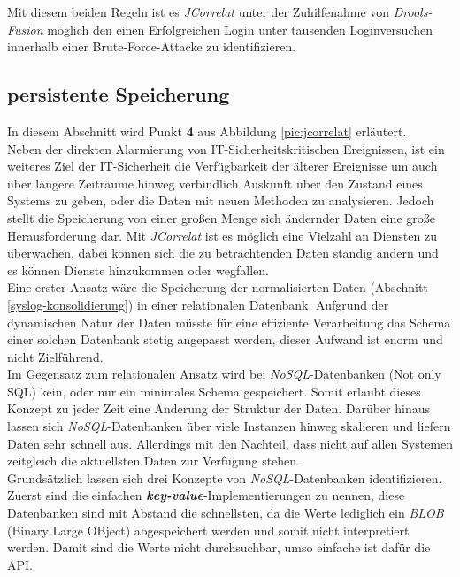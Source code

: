 Mit diesem beiden Regeln ist es \textit{JCorrelat} unter der Zuhilfenahme von 
\textit{Drools-Fusion} möglich den einen Erfolgreichen Login unter tausenden 
Loginversuchen innerhalb einer Brute-Force-Attacke zu identifizieren.

\subsection{persistente Speicherung}\label{nosql}

In diesem Abschnitt wird Punkt \textbf{4} aus Abbildung \ref{pic:jcorrelat} erläutert.\\

Neben der direkten Alarmierung von IT-Sicherheitskritischen Ereignissen, ist ein weiteres 
Ziel der IT-Sicherheit die Verfügbarkeit der älterer Ereignisse um auch über längere 
Zeiträume hinweg verbindlich Auskunft über den Zustand eines Systems zu geben, oder die 
Daten mit neuen Methoden zu analysieren. Jedoch stellt die Speicherung von einer großen 
Menge sich ändernder Daten eine große Herausforderung dar. Mit \textit{JCorrelat} ist es 
möglich eine Vielzahl an Diensten zu überwachen, dabei können sich die zu betrachtenden 
Daten ständig ändern und es können Dienste hinzukommen oder wegfallen.\\

Eine erster Ansatz wäre die Speicherung der normalisierten Daten (Abschnitt 
\ref{syslog-konsolidierung}) in einer relationalen Datenbank. Aufgrund der dynamischen 
Natur der Daten müsste für eine effiziente Verarbeitung das Schema einer solchen 
Datenbank stetig angepasst werden, dieser Aufwand ist enorm und nicht Zielführend.\\
Im Gegensatz zum relationalen Ansatz wird bei \textit{NoSQL}-Datenbanken (Not only SQL) 
kein, oder nur ein minimales Schema gespeichert. Somit erlaubt dieses Konzept zu jeder 
Zeit eine Änderung der Struktur der Daten. Darüber hinaus lassen sich 
\textit{NoSQL}-Datenbanken über viele Instanzen hinweg skalieren und liefern Daten sehr 
schnell aus. Allerdings mit den Nachteil, dass nicht auf allen Systemen zeitgleich die 
aktuellsten Daten zur Verfügung stehen.\\

Grundsätzlich lassen sich drei Konzepte von \textit{NoSQL}-Datenbanken identifizieren. 
Zuerst sind die einfachen \textbf{\emph{key-value}}-Implementierungen zu nennen, diese 
Datenbanken sind mit Abstand die schnellsten, da die Werte lediglich ein \textit{BLOB} 
(Binary Large OBject) abgespeichert werden und somit nicht interpretiert werden. Damit 
sind die Werte nicht durchsuchbar, umso einfache ist dafür die API.\\

